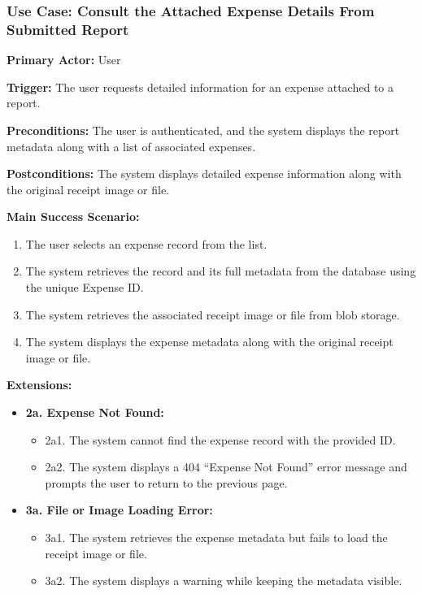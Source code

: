 \subsubsection{\textbf{Use Case: Consult the Attached Expense Details From Submitted Report}}

\textbf{Primary Actor:} User

\textbf{Trigger:} The user requests detailed information for an expense attached to a report.

\textbf{Preconditions:} The user is authenticated, and the system displays the report metadata along with a list of associated expenses.

\textbf{Postconditions:} The system displays detailed expense information along with the original receipt image or file.

\vspace{0.5cm}

\textbf{Main Success Scenario:}

\begin{enumerate} [leftmargin=0.75cm, noitemsep]
\item The user selects an expense record from the list.
\item The system retrieves the record and its full metadata from the database using the unique Expense ID.
\item The system retrieves the associated receipt image or file from blob storage.
\item The system displays the expense metadata along with the original receipt image or file.
\end{enumerate}

\vspace{0.3cm}

\textbf{Extensions:}

\begin{itemize} [label={}, leftmargin=0.75cm, noitemsep]

    \item \textbf{2a. Expense Not Found:}
    \begin{itemize} [label={}, leftmargin=0.75cm, noitemsep]
        \item 2a1. The system cannot find the expense record with the provided ID.
        \item 2a2. The system displays a 404 ``Expense Not Found'' error message and prompts the user to return to the previous page.
    \end{itemize}

    \item \textbf{3a. File or Image Loading Error:}
    \begin{itemize} [label={}, leftmargin=0.75cm, noitemsep]
        \item 3a1. The system retrieves the expense metadata but fails to load the receipt image or file.
        \item 3a2. The system displays a warning while keeping the metadata visible.
    \end{itemize}

\end{itemize}

\vspace{0.3cm}
